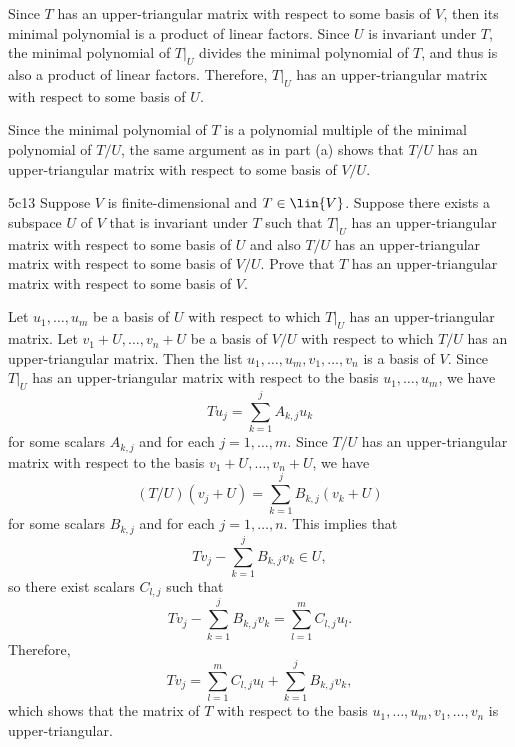 \begin{solenum}
    \item Since $T$ has an upper-triangular matrix with respect to some basis of $V$, then its minimal polynomial is a product of linear factors.
    Since $U$ is invariant under $T$, the minimal polynomial of $T|_U$ divides the minimal polynomial of $T$, and thus is also a product of linear factors.
    Therefore, $T|_U$ has an upper-triangular matrix with respect to some basis of $U$.
    \item Since the minimal polynomial of $T$ is a polynomial multiple of the minimal polynomial of $T/U$, the same argument as in part (a) shows that $T/U$ has an upper-triangular matrix with respect to some basis of $V/U$.
\end{solenum}

\begin{exercise}{5c13}
    Suppose $V$ is finite-dimensional and $T \in \lin{V}$.
    Suppose there exists a subspace $U$ of $V$ that is invariant under $T$ such that $T|_U$ has an upper-triangular matrix with respect to some basis of $U$ and also $T/U$ has an upper-triangular matrix with respect to some basis of $V/U$.
    Prove that $T$ has an upper-triangular matrix with respect to some basis of $V$.
\end{exercise}

\begin{sol}
    Let $u_1, \ldots, u_m$ be a basis of $U$ with respect to which $T|_U$ has an upper-triangular matrix.
    Let $v_1 + U, \ldots, v_n + U$ be a basis of $V/U$ with respect to which $T/U$ has an upper-triangular matrix.
    Then the list $u_1, \ldots, u_m, v_1, \ldots, v_n$ is a basis of $V$.
    Since $T|_U$ has an upper-triangular matrix with respect to the basis $u_1, \ldots, u_m$, we have
    \[
        Tu_j = \sum_{k=1}^j A_{k,j}u_k
    \]
    for some scalars $A_{k,j}$ and for each $j = 1, \ldots, m$.
    Since $T/U$ has an upper-triangular matrix with respect to the basis $v_1 + U, \ldots, v_n + U$, we have
    \[
        (T/U)(v_j + U) = \sum_{k=1}^j B_{k,j}(v_k + U)
    \]
    for some scalars $B_{k,j}$ and for each $j = 1, \ldots, n$.
    This implies that
    \[
        Tv_j - \sum_{k=1}^j B_{k,j}v_k \in U,
    \]
    so there exist scalars $C_{l,j}$ such that
    \[
        Tv_j - \sum_{k=1}^j B_{k,j}v_k = \sum_{l=1}^m C_{l,j}u_l.
    \]
    Therefore,
    \[
        Tv_j = \sum_{l=1}^m C_{l,j}u_l + \sum_{k=1}^j B_{k,j}v_k,
    \]
    which shows that the matrix of $T$ with respect to the basis $u_1, \ldots, u_m, v_1, \ldots, v_n$ is upper-triangular.
\end{sol}

